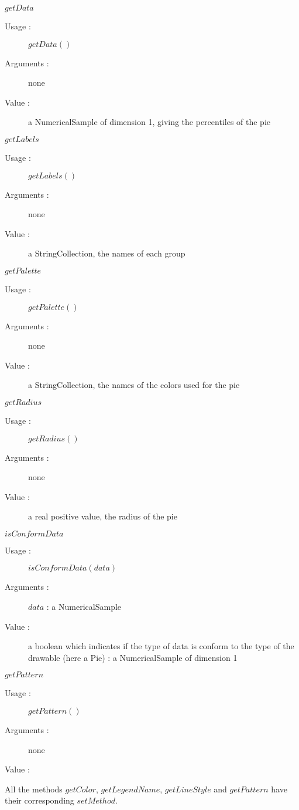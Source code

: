\begin{description}
\begin{description}
  \item $getData$
    \begin{description}
    \item[Usage :] $getData()$
    \item[Arguments :] none
    \item[Value :] a NumericalSample of dimension 1, giving the percentiles of the pie
    \end{description}
    \bigskip
  \item $getLabels$
    \begin{description}
    \item[Usage :] $getLabels()$
    \item[Arguments :] none
    \item[Value :] a StringCollection, the names of each group
    \end{description}
    \bigskip
  \item $getPalette$
    \begin{description}
    \item[Usage :] $getPalette()$
    \item[Arguments :] none
    \item[Value :] a StringCollection, the names of the colors used for the pie
    \end{description}
    \bigskip
  \item $getRadius$
    \begin{description}
    \item[Usage :] $getRadius()$
    \item[Arguments :] none
    \item[Value :] a real positive value, the radius of the pie
    \end{description}
    \bigskip
  \item $isConformData$
    \begin{description}
    \item[Usage :] $isConformData(data)$
    \item[Arguments :] $data$ : a NumericalSample
    \item[Value :] a boolean which indicates if the type of data is conform to the type of the drawable (here a Pie) : a NumericalSample of dimension 1
    \end{description}

    \bigskip
  \item $getPattern$
    \begin{description}
    \item[Usage :] $getPattern()$
    \item[Arguments :] none
    \item[Value :]
    \end{description}

  \end{description}

  All the methods $getColor$,  $getLegendName$,  $getLineStyle$  and $getPattern$ have their corresponding $setMethod$.

\end{description}


